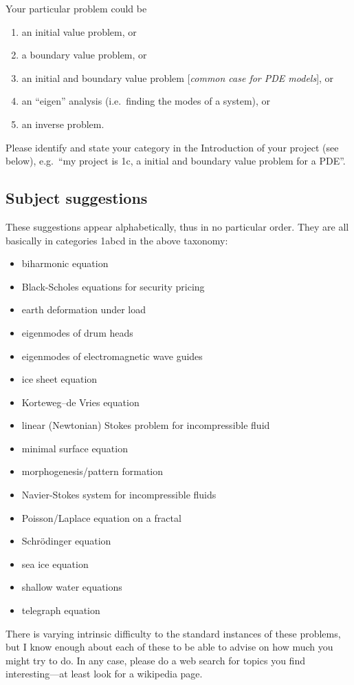 \documentclass[11pt]{amsart}
\begin{document}
Your particular problem could be
\renewcommand{\labelenumi}{\alph{enumi}.}
\begin{enumerate}
\item an initial value problem, or
\item a boundary value problem, or
\item an initial and boundary value problem [\emph{common case for PDE models}], or
\item an ``eigen'' analysis (i.e.~finding the modes of a system), or
\item an inverse problem.
\end{enumerate}
Please identify and state your category in the Introduction of your project (see below), e.g.~``my project is 1c, a initial and boundary value problem for a PDE''.

\subsection*{Subject suggestions}  These suggestions appear alphabetically, thus in no particular order.  They are all basically in categories 1abcd in the above taxonomy:
\begin{itemize}
\item biharmonic equation
\item Black-Scholes equations for security pricing
\item earth deformation under load
\item eigenmodes of drum heads
\item eigenmodes of electromagnetic wave guides
\item ice sheet equation
\item Korteweg--de Vries equation
\item linear (Newtonian) Stokes problem for incompressible fluid
\item minimal surface equation
\item morphogenesis/pattern formation
\item Navier-Stokes system for incompressible fluids
\item Poisson/Laplace equation on a fractal
\item Schr\"odinger equation
\item sea ice equation
\item shallow water equations
\item telegraph equation
\end{itemize}
There is varying intrinsic difficulty to the standard instances of these problems, but I know enough about each of these to be able to advise on how much you might try to do.  In any case, please do a web search for topics you find interesting---at least look for a wikipedia page.
\end{document}
